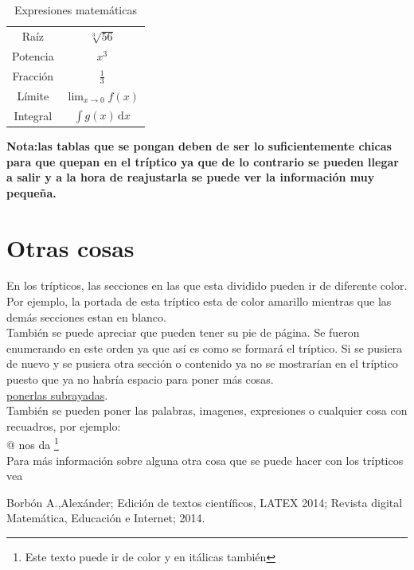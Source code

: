 \documentclass[10pt, notumble, letterpaper]{leaflet}
\begin{document}
\begin{table}[h!]
\centering
\begin{tabular}{|c|c|} \hline
\multirow{2}{*}{Raíz} & \multirow{2}{*}{$\sqrt[3]{56}$} \\
& \\ \hline
\multirow{2}{*}{Potencia} & \multirow{2}{*}{$x^3$} \\
& \\ \hline
\multirow{2}{*}{Fracción} & \multirow{2}{*}{$\frac{1}{3}$} \\
& \\ \hline
\multirow{2}{*}{Límite} & \multirow{2}{*}{$\displaystyle \lim_{x\to 0} f(x)$} \\
& \\ \hline
\multirow{2}{*}{Integral} & \multirow{2}{*}{$\int \! g(x) \, \mathrm{d}x $} \\
& \\ \hline
\end{tabular}
\caption{Expresiones matemáticas}
\end{table}

\textbf{Nota:las tablas que se pongan deben de ser lo suficientemente chicas para que quepan en el tríptico ya que de lo contrario se pueden llegar a salir y a la hora de reajustarla se puede ver la información muy pequeña.}

\newpage
\section{Otras cosas}
En los trípticos, las secciones en las que esta dividido pueden ir de diferente color. Por ejemplo, la portada de esta tríptico esta de color amarillo  mientras que las demás secciones estan en blanco.\\

También se puede apreciar que pueden tener su pie de página. Se fueron enumerando en este orden ya que así es como se formará el tríptico.
Si se pusiera de nuevo \verb@\newpage@ y se pusiera otra sección o contenido ya no se mostrarían en el tríptico puesto que ya no habría espacio para poner más cosas.\\

{\color {red}{Podemos cambiar de color las letras o}} \underline{ponerlas subrayadas}.\\

También se pueden poner las palabras, imagenes, expresiones o cualquier cosa con recuadros, por ejemplo:\\

\verb@{}@ nos da \footnote{Este texto puede ir de color y en itálicas también}\\

Para más información sobre alguna otra cosa que se puede hacer con los trípticos vea \cite[cap.13]{LATEX 2014}

\begin{thebibliography}{99}
 Borbón A.,Alexánder; Edición de textos científicos, LATEX 2014; Revista digital Matemática, Educación e Internet; 2014.
\end{thebibliography}
\end{document}
